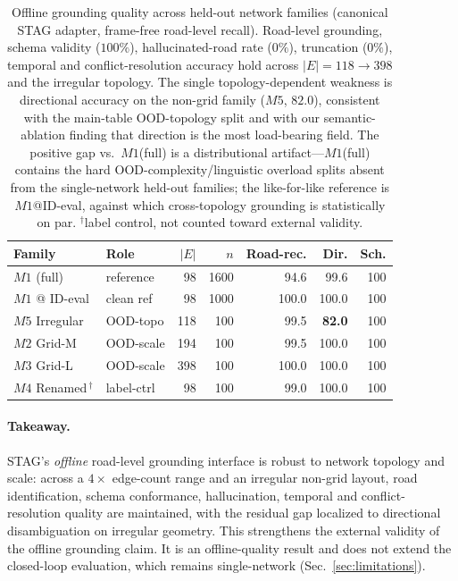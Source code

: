 \begin{table}[t]
\centering
\footnotesize
\setlength{\tabcolsep}{3pt}
\begin{tabular}{@{}llrrrrr@{}}
\toprule
Family & Role & $|E|$ & $n$ & Road-rec. & Dir. & Sch. \\
\midrule
$M1$ (full)        & reference   & 98  & 1600 & 94.6  & 99.6  & 100 \\
$M1$ @ ID-eval     & clean ref   & 98  & 1000 & 100.0 & 100.0 & 100 \\
\midrule
$M5$ Irregular     & OOD-topo    & 118 & 100  & 99.5  & \textbf{82.0} & 100 \\
$M2$ Grid-M        & OOD-scale   & 194 & 100  & 99.5  & 100.0 & 100 \\
$M3$ Grid-L        & OOD-scale   & 398 & 100  & 100.0 & 100.0 & 100 \\
\midrule
$M4$ Renamed\,$^{\dagger}$ & label-ctrl & 98 & 100 & 99.0 & 100.0 & 100 \\
\bottomrule
\end{tabular}
\caption{Offline grounding quality across held-out network families
(canonical STAG adapter, frame-free road-level recall). Road-level grounding,
schema validity ($100\%$), hallucinated-road rate ($0\%$), truncation ($0\%$),
temporal and conflict-resolution accuracy hold across $|E|{=}118\!\to\!398$ and
the irregular topology. The single topology-dependent weakness is directional
accuracy on the non-grid family ($M5$, $82.0$), consistent with the main-table
OOD-topology split and with our semantic-ablation finding that direction is the
most load-bearing field. The positive gap vs.\ $M1$(full) is a distributional
artifact---$M1$(full) contains the hard OOD-complexity/linguistic overload splits
absent from the single-network held-out families; the like-for-like reference is
$M1$@ID-eval, against which cross-topology grounding is statistically on par.
$^{\dagger}$label control, not counted toward external validity.}
\label{tab:r4-cross-topology}
\end{table}

\paragraph{Takeaway.} STAG's \emph{offline} road-level grounding interface is
robust to network topology and scale: across a $4\times$ edge-count range and an
irregular non-grid layout, road identification, schema conformance, hallucination,
temporal and conflict-resolution quality are maintained, with the residual gap
localized to directional disambiguation on irregular geometry. This strengthens
the external validity of the offline grounding claim. It is an offline-quality
result and does not extend the closed-loop evaluation, which remains
single-network (Sec.~\ref{sec:limitations}).
